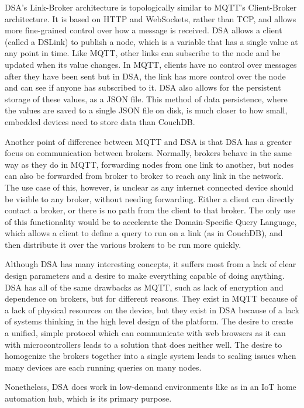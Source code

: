 \documentclass{article}
\begin{document}
DSA's Link-Broker architecture is topologically similar to MQTT's Client-Broker architecture. It is based on HTTP and WebSockets, rather than TCP, and allows more fine-grained control over how a message is received. DSA allows a client (called a DSLink) to publish a node, which is a variable that has a single value at any point in time. Like MQTT, other links can subscribe to the node and be updated when its value changes. In MQTT, clients have no control over messages after they have been sent but in DSA, the link has more control over the node and can see if anyone has subscribed to it. DSA also allows for the persistent storage of these values, as a JSON file. This method of data persistence, where the values are saved to a single JSON file on disk, is much closer to how small, embedded devices need to store data than CouchDB.

Another point of difference between MQTT and DSA is that DSA has a greater focus on communication between brokers. Normally, brokers behave in the same way as they do in MQTT, forwarding nodes from one link to another, but nodes can also be forwarded from broker to broker to reach any link in the network. The use case of this, however, is unclear as any internet connected device should be visible to any broker, without needing forwarding. Either a client can directly contact a broker, or there is no path from the client to that broker. The only use of this functionality would be to accelerate the Domain-Specific Query Language, which allows a client to define a query to run on a link (as in CouchDB), and then distribute it over the various brokers to be run more quickly.

Although DSA has many interesting concepts, it suffers most from a lack of clear design parameters and a desire to make everything capable of doing anything. DSA has all of the same drawbacks as MQTT, such as lack of encryption and dependence on brokers, but for different reasons. They exist in MQTT because of a lack of physical resources on the device, but they exist in DSA because of a lack of systems thinking in the high level design of the platform. The desire to create a unified, simple protocol which can communicate with web browsers as it can with microcontrollers leads to a solution that does neither well. The desire to homogenize the brokers together into a single system leads to scaling issues when many devices are each running queries on many nodes. 

Nonetheless, DSA does work in low-demand environments like as in an IoT home automation hub, which is its primary purpose.
\end{document}
